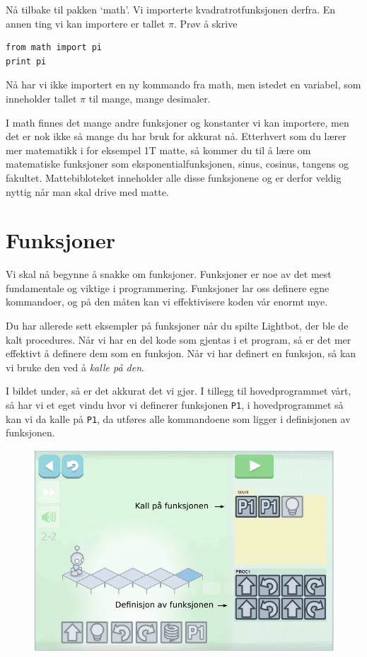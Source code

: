 \documentclass[a4paper, 11pt, notitlepage]{article}
\begin{document}
Nå tilbake til pakken `math'. Vi importerte kvadratrotfunksjonen derfra. En annen ting vi kan importere er tallet $\pi$. Prøv å skrive
\begin{lstlisting}
from math import pi 
print pi
\end{lstlisting}
Nå har vi ikke importert en ny kommando fra math, men istedet en variabel, som inneholder tallet $\pi$ til mange, mange desimaler.

I math finnes det mange andre funksjoner og konstanter vi kan importere, men det er nok ikke så mange du har bruk for akkurat nå. Etterhvert som du lærer mer matematikk i for eksempel 1T matte, så kommer du til å lære om matematiske funksjoner som eksponentialfunksjonen, sinus, cosinus, tangens og fakultet. Mattebibloteket inneholder alle disse funksjonene og er derfor veldig nyttig når man skal drive med matte.

\section*{Funksjoner}

Vi skal nå begynne å snakke om funksjoner. Funksjoner er noe av det mest fundamentale og viktige i programmering. Funksjoner lar oss definere egne kommandoer, og på den måten kan vi effektivisere koden vår enormt mye.

Du har allerede sett eksempler på funksjoner når du spilte Lightbot, der ble de kalt procedures. Når vi har en del kode som gjentas i et program, så er det mer effektivt å definere dem som en funksjon. Når vi har definert en funksjon, så kan vi bruke den ved å \emph{kalle på den}. 

I bildet under, så er det akkurat det vi gjør. I tillegg til hovedprogrammet vårt, så har vi et eget vindu hvor vi definerer funksjonen \verb+P1+, i hovedprogrammet så kan vi da kalle på \verb+P1+, da utføres alle kommandoene som ligger i definisjonen av funksjonen.

\begin{figure}[h!]
\centering
\includegraphics[width=\textwidth]{func2}
\end{figure}
\end{document}
